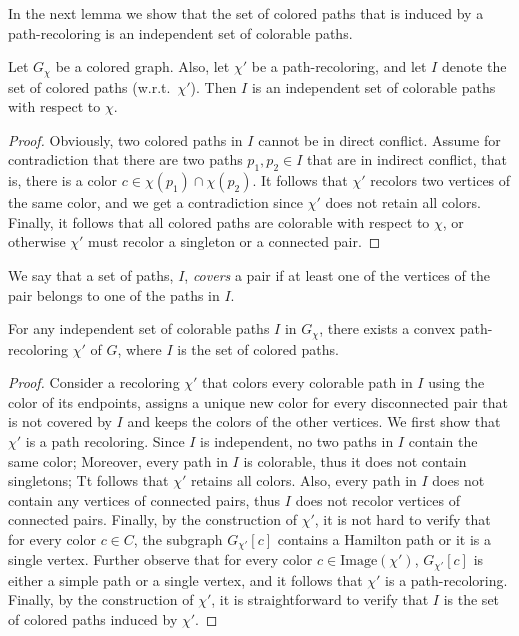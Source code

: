 In the next lemma we show that the set of colored paths that is
induced by a path-recoloring is an independent set of colorable paths.

\begin{lemma}
\label{lm:independent}
Let $G_\chi$ be a colored graph.
%
Also, 
let $\chi'$ be a path-recoloring,
and let $I$ denote the set of colored paths (w.r.t.\ $\chi'$).  
%
Then $I$ is an independent set of colorable paths with respect to $\chi$.
\end{lemma}

\begin{proof}
Obviously, 
two colored paths in $I$ cannot be in direct conflict.
%
Assume for contradiction that there are two paths $p_1, p_2 \in I$
that are in indirect conflict, 
that is, 
there is a color $c \in \chi(p_1) \cap \chi(p_2)$.
%
It follows that $\chi'$ recolors two vertices of the same color, 
and we get a contradiction since $\chi'$ does not retain all colors.
%
Finally, 
it follows that all colored paths are colorable with respect to $\chi$, 
or otherwise $\chi'$ must recolor a singleton or a connected pair.
{}\end{proof}

We say that a set of paths, $I$, \emph{covers} a pair if at least one of the
vertices of the pair belongs to one of the paths in $I$.

\begin{lemma}
\label{lm:independent_set_is_recoloring}
For any independent set of colorable paths $I$ in $G_{\chi}$, 
there exists a convex path-recoloring $\chi'$ of $G$, 
where $I$ is the set of colored paths.
\end{lemma}

\begin{proof}
Consider a recoloring $\chi'$ that colors every colorable path in $I$
using the color of its endpoints, assigns a unique new color for
every disconnected pair that is not covered by $I$ 
and keeps the colors of the other vertices.
%
We first show that $\chi'$ is a path recoloring.  
%
Since $I$ is independent, 
no two paths in $I$ contain the same color;
Moreover,
every path in $I$ is colorable, 
thus it does not contain singletons; 
Tt follows that $\chi'$ retains all colors.  
%
Also, every path in $I$ does not contain any vertices of connected pairs, 
thus $I$ does not recolor vertices of connected pairs.
%
Finally, by the construction of $\chi'$, 
it is not hard to verify that for every color $c \in C$,
the subgraph $G_{\chi'}[c]$ contains a Hamilton path or it is a single vertex.
%
Further observe that for every color $c \in \text{Image}(\chi')$,
$G_{\chi'}[c]$ is either a simple path or a single vertex, and it
follows that $\chi'$ is a path-recoloring.  
%
Finally, by the
construction of $\chi'$, it is straightforward to verify that $I$ is
the set of colored paths induced by $\chi'$.
\end{proof}

